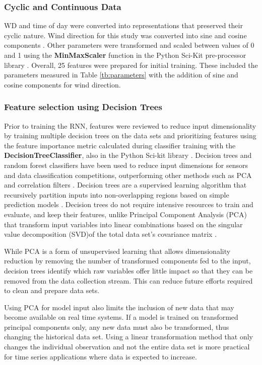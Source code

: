 \documentclass[preprint,12pt,a4paper,authoryear]{elsarticle}
\begin{document}
\begin{linenumbers}
\subsubsection{Cyclic and Continuous Data}
WD and time of day were converted into representations that preserved their cyclic nature. Wind direction for this study was converted into sine and cosine components \citep{Arhami2013}. Other parameters were transformed and scaled between values of 0 and 1 \citep{Chatterjee2017} using the \textbf{MinMaxScaler} function in the Python Sci-Kit pre-processor library \citep{scikit2011}. Overall, 25 features were prepared for initial training. These included the parameters measured in Table \ref{tb:parameters} with the addition of sine and cosine components for wind direction. 
 
\subsubsection{Feature selection using Decision Trees}
Prior to training the RNN, features were reviewed to reduce input dimensionality by training multiple decision trees  on the data sets and prioritizing features using the feature importance metric calculated during classifier training with the \textbf{DecisionTreeClassifier}, also in the Python Sci-kit library \citep{scikit2011}. Decision trees and random forest classifiers have been used to reduce input dimensions for sensors \citep{Cho2011} and data classification competitions, outperforming other methods such as PCA and correlation filters \citep{Silipo2014, Al-Alawi2008}. Decision trees are a supervised learning algorithm that recursively partition inputs into non-overlapping regions based on simple prediction models \citep{Singh2013, Loh2011}.  Decision trees do not require intensive resources to train and evaluate, and keep their features, unlike Principal Component Analysis (PCA) that transform input variables into linear combinations based on the singular value decomposition (SVD)of the total data set's covariance matrix \citep{Wang2016}. 

While PCA is a form of unsupervised learning that allows dimensionality reduction by removing the number of transformed components fed to the input, decision trees identify which raw variables offer little impact so that they can be removed from the data collection stream. This can reduce future efforts required to clean and prepare data sets. 

Using PCA for model input also limits the inclusion of new data that may become available on real time systems. If a model is trained on transformed principal components only, any new data must also be transformed, thus changing the historical data set. Using a linear transformation method that only changes the individual observation and not the entire data set is more practical for time series applications where data is expected to increase. 


\end{linenumbers}
\end{document}
